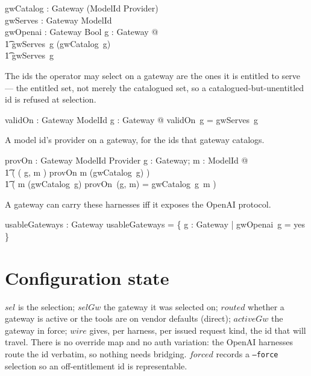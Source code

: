 \documentclass{article}
\begin{document}
\begin{axdef}
  gwCatalog : Gateway \fun (ModelId \pfun Provider) \\
  gwServes : Gateway \fun \power ModelId \\
  gwOpenai : Gateway \fun Bool
\where
  \forall g : Gateway @ \\
  \t1 gwServes~g \subseteq \dom (gwCatalog~g) \land \\
  \t1 gwServes~g \neq \emptyset
\end{axdef}

The ids the operator may select on a gateway are the ones it is entitled to
serve --- the entitled set, not merely the catalogued set, so a
catalogued-but-unentitled id is refused at selection.

\begin{axdef}
  validOn : Gateway \fun \power ModelId
\where
  \forall g : Gateway @ validOn~g = gwServes~g
\end{axdef}

A model id's provider on a gateway, for the ids that gateway catalogs.

\begin{axdef}
  provOn : Gateway \cross ModelId \pfun Provider
\where
  \forall g : Gateway; m : ModelId @ \\
  \t1 ( ( g, m ) \in \dom provOn \iff m \in \dom (gwCatalog~g) ) \land \\
  \t1 ( m \in \dom (gwCatalog~g) \implies provOn~(g, m) = gwCatalog~g~m )
\end{axdef}

A gateway can carry these harnesses iff it exposes the OpenAI protocol.

\begin{axdef}
  usableGateways : \power Gateway
\where
  usableGateways = \{ g : Gateway | gwOpenai~g = yes \}
\end{axdef}

\section{Configuration state}

$sel$ is the selection; $selGw$ the gateway it was selected on; $routed$ whether
a gateway is active or the tools are on vendor defaults (direct); $activeGw$ the
gateway in force; $wire$ gives, per harness, per issued request kind, the id
that will travel. There is no override map and no auth variation: the OpenAI
harnesses route the id verbatim, so nothing needs bridging. $forced$ records a
\texttt{--force} selection so an off-entitlement id is representable.
\end{document}
